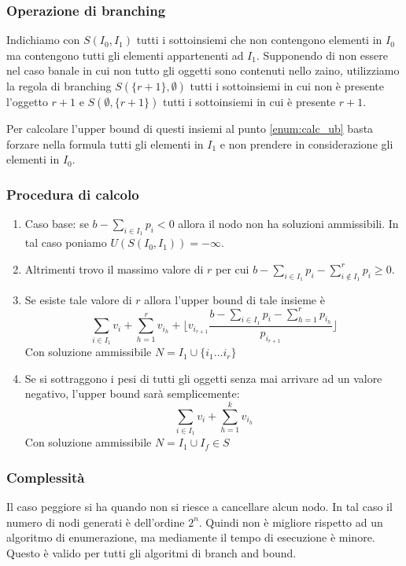\documentclass[../template]{subfiles}
\begin{document}
\subsubsection{Operazione di branching}
Indichiamo con $S(I_0, I_1)$ tutti i sottoinsiemi che non contengono elementi in $I_0$ ma contengono tutti gli elementi appartenenti ad $I_1$.
Supponendo di non essere nel caso banale in cui non tutto gli oggetti sono contenuti nello zaino,
utilizziamo la regola di branching $S(\{r + 1\}, \emptyset)$ tutti i sottoinsiemi in cui non è presente l'oggetto $r +1$ e $S(\emptyset, \{r + 1\})$ tutti i sottoinsiemi in cui è presente $r + 1$.

Per calcolare l'upper bound di questi insiemi al punto \ref{enum:calc_ub} basta forzare nella formula tutti gli elementi in $I_1$ e non prendere in considerazione gli elementi in $I_0$.

\subsubsection{Procedura di calcolo}
\begin{enumerate}
    \item Caso base: se $b - \sum_{i \in I_1} p_i < 0$ allora il nodo non ha soluzioni ammissibili. In tal caso poniamo $U(S(I_0, I_1)) = -\infty$.
    \item Altrimenti trovo il massimo valore di $r$ per cui $b - \sum_{i \in I_1} p_i -\sum^{r}_{i \notin I_1} p_i \ge 0$.
    \item Se esiste tale valore di $r$ allora l'upper bound di tale insieme è
        \[
            \sum_{i \in I_1} v_i + \sum_{h=1}^r v_{i_h} + \Big\lfloor v_{i_{r+1}} \frac{b - \sum_{i\in I_1} p_i - \sum^r_{h=1} p_{i_h}}{p_{i_{r+1}}} \Big\rfloor
        \]
        Con soluzione ammissibile $N = I_1 \cup \{i_1\dots i_r\}$
    \item Se si sottraggono i pesi di tutti gli oggetti senza mai arrivare ad un valore negativo,
        l'upper bound sarà semplicemente:
        \[
            \sum_{i \in I_1} v_i + \sum_{h=1}^k v_{i_h}
        \]
        Con soluzione ammissibile $N = I_1 \cup I_f \in S$
\end{enumerate}
\subsubsection{Complessità}
Il caso peggiore si ha quando non si riesce a cancellare alcun nodo. In tal caso il numero di  nodi generati è dell'ordine $2^n$.
Quindi non è migliore rispetto ad un algoritmo di enumerazione, ma mediamente il tempo di esecuzione è minore.
Questo è valido per tutti gli algoritmi di branch and bound.
\end{document}
